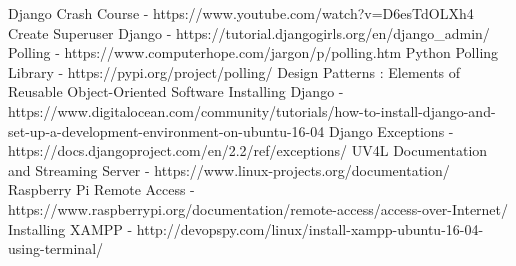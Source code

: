 \cleardoublepage
{}
{}
\begin{thebibliography}{99}

Django Crash Course - https://www.youtube.com/watch?v=D6esTdOLXh4
Create Superuser Django - https://tutorial.djangogirls.org/en/django\_admin/
 Polling - https://www.computerhope.com/jargon/p/polling.htm
 Python Polling Library - https://pypi.org/project/polling/
 Design Patterns : Elements of Reusable Object-Oriented Software
 Installing Django - https://www.digitalocean.com/community/tutorials/how-to-install-django-and-set-up-a-development-environment-on-ubuntu-16-04
 Django Exceptions - https://docs.djangoproject.com/en/2.2/ref/exceptions/
 UV4L Documentation and Streaming Server - https://www.linux-projects.org/documentation/
 Raspberry Pi Remote Access - https://www.raspberrypi.org/documentation/remote-access/access-over-Internet/
Installing XAMPP - http://devopspy.com/linux/install-xampp-ubuntu-16-04-using-terminal/




\end{thebibliography}
